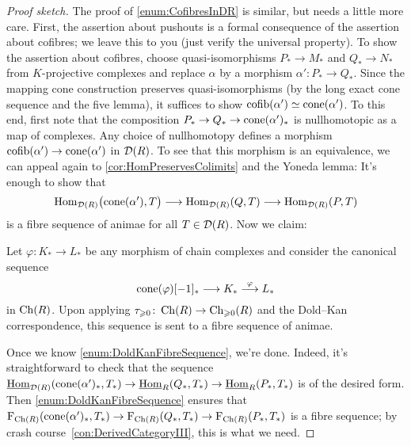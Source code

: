 \begin{proof}[Proof sketch]
	The proof of \cref{enum:CofibresInDR} is similar, but needs a little more care. First, the assertion about pushouts is a formal consequence of the assertion about cofibres; we leave this to you (just verify the universal property). To show the assertion about cofibres, choose quasi-isomorphisms $P_*\rightarrow M_*$ and $Q_*\rightarrow N_*$ from $K$-projective complexes and replace $\alpha$ by a morphism $\alpha'\colon P_*\rightarrow Q_*$. Since the mapping cone construction preserves quasi-isomorphisms (by the long exact cone sequence and the five lemma), it suffices to show $\operatorname{cofib}(\alpha')\simeq \operatorname{cone}(\alpha')$. To this end, first note that the composition $P_*\rightarrow Q_*\rightarrow \operatorname{cone}(\alpha')_*$ is nullhomotopic as a map of complexes. Any choice of nullhomotopy defines a morphism $\operatorname{cofib}(\alpha')\rightarrow \operatorname{cone}(\alpha')$ in $\mathcal{D}(R)$. To see that this morphism is an equivalence, we can appeal again to \cref{cor:HomPreservesColimits} and the Yoneda lemma: It's enough to show that
	\begin{equation*}
		\operatorname{Hom}_{\mathcal{D}(R)}\bigl(\operatorname{cone}(\alpha'),T\bigr)\longrightarrow\operatorname{Hom}_{\mathcal{D}(R)}(Q,T)\longrightarrow\operatorname{Hom}_{\mathcal{D}(R)}(P,T)
	\end{equation*}
	is a fibre sequence of animae for all $T\in\mathcal{D}(R)$. Now we claim:
	\begin{alphanumerate}\itshape
		\item[\boxtimes] Let $\varphi\colon K_*\rightarrow L_*$ be any morphism of chain complexes and consider the canonical sequence\label{enum:DoldKanFibreSequence}
		\begin{equation*}
			\operatorname{cone}(\varphi)[-1]_*\longrightarrow K_*\overset{\varphi}{\longrightarrow} L_*
		\end{equation*}
		in $\operatorname{Ch}(R)$. Upon applying $\tau_{\geqslant 0}\colon \operatorname{Ch}(R)\rightarrow \operatorname{Ch}_{\geqslant 0}(R)$ and the Dold--Kan correspondence, this sequence is sent to a fibre sequence of animae.
	\end{alphanumerate}
	Once we know \cref{enum:DoldKanFibreSequence}, we're done. Indeed, it's straightforward to check that the sequence $\operatorname{\underline{Hom}}_{\mathcal{D}(R)}(\operatorname{cone}(\alpha')_*,T_*)\rightarrow\operatorname{\underline{Hom}}_{R}(Q_*,T_*)\rightarrow\operatorname{\underline{Hom}}_{R}(P_*,T_*)$ is of the desired form. Then \cref{enum:DoldKanFibreSequence} ensures that $\operatorname{F}_{\operatorname{Ch}(R)}(\operatorname{cone}(\alpha')_*,T_*)\rightarrow\operatorname{F}_{\operatorname{Ch}(R)}(Q_*,T_*)\rightarrow\operatorname{F}_{\operatorname{Ch}(R)}(P_*,T_*)$ is a fibre sequence; by crash course~\cref{con:DerivedCategoryIII}, this is what we need.
	

\end{proof}
